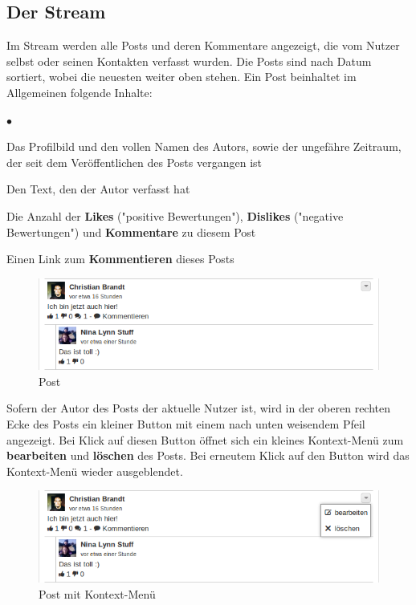\documentclass[10pt,a4paper]{book}
\makeatletter
\def\ScaleIfNeeded{%
\ifdim\Gin@nat@width>\linewidth
\linewidth
\else
\Gin@nat@width
\fi
}
\makeatother
\begin{document}
\subsection{Der Stream}
Im Stream werden alle Posts und deren Kommentare angezeigt, die vom Nutzer selbst oder seinen Kontakten verfasst wurden. Die Posts sind nach Datum sortiert, wobei die neuesten weiter oben stehen.
Ein Post beinhaltet im Allgemeinen folgende Inhalte:
\begin{list}{$\bullet$}{}
\item Das Profilbild und den vollen Namen des Autors, sowie der ungefähre Zeitraum, der seit dem Veröffentlichen des Posts vergangen ist
\item Den Text, den der Autor verfasst hat
\item Die Anzahl der \textbf{Likes} ("positive Bewertungen"), \textbf{Dislikes} ("negative Bewertungen") und \textbf{Kommentare} zu diesem Post
\item Einen Link zum \textbf{Kommentieren} dieses Posts
\end{list}
\begin{figure}[htbp]
\centering
\includegraphics[width=\ScaleIfNeeded]{Pictures/screen_post.png}%
\caption{Post}%
\end{figure}
Sofern der Autor des Posts der aktuelle Nutzer ist, wird in der oberen rechten Ecke des Posts ein kleiner Button mit einem nach unten weisendem Pfeil angezeigt. Bei Klick auf diesen Button öffnet sich ein kleines Kontext-Menü zum \textbf{bearbeiten} und \textbf{löschen} des Posts. Bei erneutem Klick auf den Button wird das Kontext-Menü wieder ausgeblendet.
\begin{figure}[htbp]
\centering
\includegraphics[width=\ScaleIfNeeded]{Pictures/screen_post_menu.png}%
\caption{Post mit Kontext-Menü}%
\end{figure}
\end{document}
